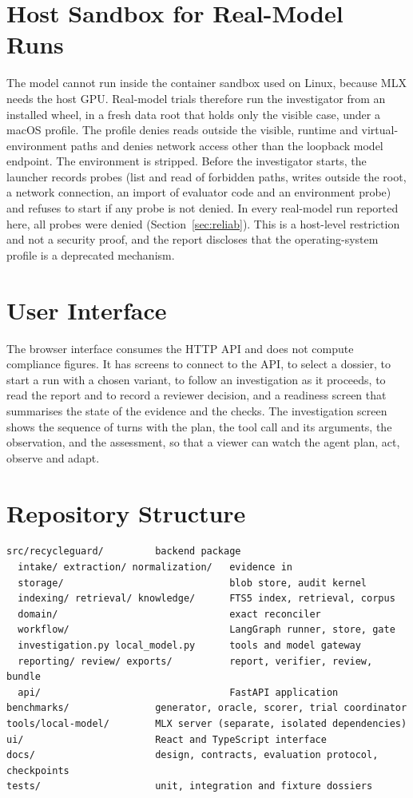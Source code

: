 \section{Host Sandbox for Real-Model Runs}
\label{sec:sandbox}
The model cannot run inside the container sandbox used on Linux, because MLX needs the host GPU. Real-model
trials therefore run the investigator from an installed wheel, in a fresh data root that holds only the visible
case, under a macOS  profile. The profile denies reads outside the visible, runtime and
virtual-environment paths and denies network access other than the loopback model endpoint. The environment
is stripped. Before the investigator starts, the launcher records probes (list and read of forbidden paths,
writes outside the root, a network connection, an import of evaluator code and an environment probe) and
refuses to start if any probe is not denied. In every real-model run reported here, all probes were denied
(Section~\ref{sec:reliab}). This is a host-level restriction and not a security proof, and the report
discloses that the operating-system profile is a deprecated mechanism.

\section{User Interface}
The browser interface consumes the HTTP API and does not compute compliance figures. It has screens to
connect to the API, to select a dossier, to start a run with a chosen variant, to follow an investigation as it
proceeds, to read the report and to record a reviewer decision, and a readiness screen that summarises the
state of the evidence and the checks. The investigation screen shows the sequence of turns with the plan,
the tool call and its arguments, the observation, and the assessment, so that a viewer can watch the agent plan,
act, observe and adapt.


\section{Repository Structure}
\begin{lstlisting}[language={},numbers=none,caption={Repository layout (abridged)},label=lst:repo]
src/recycleguard/         backend package
  intake/ extraction/ normalization/   evidence in
  storage/                             blob store, audit kernel
  indexing/ retrieval/ knowledge/      FTS5 index, retrieval, corpus
  domain/                              exact reconciler
  workflow/                            LangGraph runner, store, gate
  investigation.py local_model.py      tools and model gateway
  reporting/ review/ exports/          report, verifier, review, bundle
  api/                                 FastAPI application
benchmarks/               generator, oracle, scorer, trial coordinator
tools/local-model/        MLX server (separate, isolated dependencies)
ui/                       React and TypeScript interface
docs/                     design, contracts, evaluation protocol, checkpoints
tests/                    unit, integration and fixture dossiers
\end{lstlisting}
